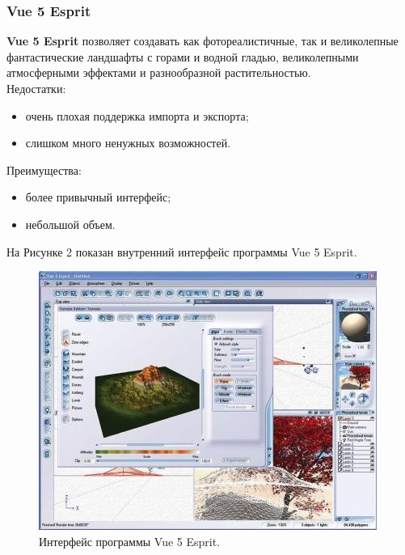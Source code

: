 \documentclass[a4paper, 10pt]{article}
\begin{document}
	\subsubsection{Vue 5 Esprit}
 	{\bf Vue 5 Esprit} позволяет создавать как фотореалистичные, так и великолепные фантастические ландшафты с горами и водной гладью, великолепными атмосферными эффектами и разнообразной растительностью.
 		\\Недостатки:
 	\begin{itemize}
 		\item очень плохая поддержка импорта и экспорта;
 		\item слишком много ненужных возможностей.
 	\end{itemize}
 	Преимущества:
 	\begin{itemize}
 		\item более привычный интерфейс;
 		\item небольшой объем.
 	\end{itemize}
 	На Рисунке 2 показан внутренний интерфейс программы Vue 5 Esprit.
 	\clearpage
 	\newpage
 	\begin{figure}[h!]
 		\centering
 		\includegraphics[scale=0.7]{vue}
 		\centering\caption{Интерфейс программы Vue 5 Esprit.}
 	\end{figure}
\end{document}
